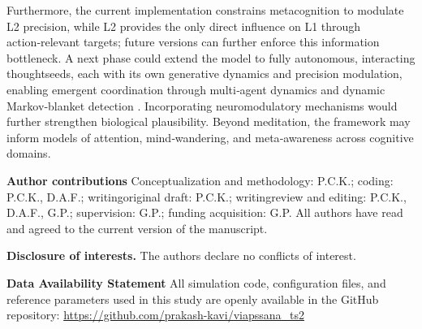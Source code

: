 \documentclass[openacc]{rsproca_new}%
\begin{document}
Furthermore, the current implementation constrains metacognition to modulate L2 precision, while L2 provides the only direct influence on L1 through action‑relevant targets; future versions can further enforce this information bottleneck. A next phase could extend the model to fully autonomous, interacting thoughtseeds, each with its own generative dynamics and precision modulation, enabling emergent coordination through multi‑agent dynamics and dynamic Markov‑blanket detection \cite{BeckRamstead2025}. Incorporating neuromodulatory mechanisms would further strengthen biological plausibility. Beyond meditation, the framework may inform models of attention, mind‑wandering, and meta‑awareness across cognitive domains. 

\vspace{\baselineskip}


\vspace{\baselineskip}
\noindent\textbf{Author contributions} Conceptualization and methodology: P.C.K.; coding: P.C.K., D.A.F.; writing\textemdash original draft: P.C.K.; writing\textemdash review and editing: P.C.K., D.A.F., G.P.; supervision: G.P.; funding acquisition: G.P. All authors have read and agreed to the current version of the manuscript.

\vspace{\baselineskip}

\noindent\textbf{Disclosure of interests.} The authors declare no conflicts of interest.

\vspace{\baselineskip}

\noindent\textbf{Data Availability Statement}
All simulation code, configuration files, and reference parameters used in this study are openly available in the GitHub repository: \url{https://github.com/prakash-kavi/viapssana_ts2}
\end{document}

